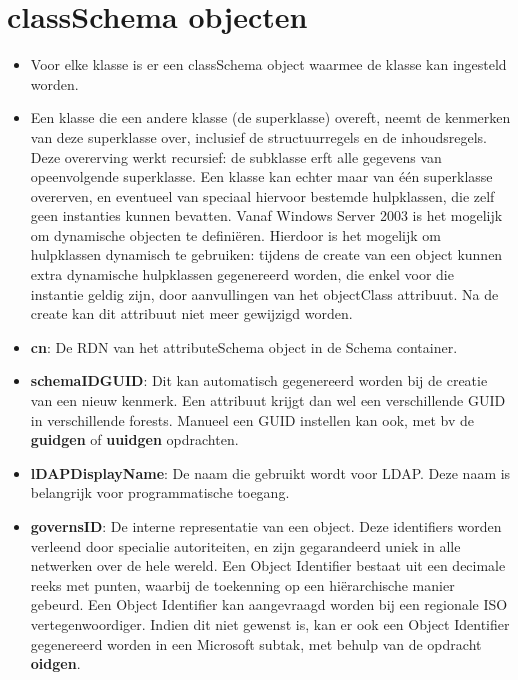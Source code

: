 \documentclass{report}
\begin{document}
	\section{classSchema objecten }
	\begin{enumerate}
		 { 
			\begin{itemize}
				\item Voor elke klasse is er een classSchema object waarmee de klasse kan ingesteld worden. 
			\end{itemize}	
		}
		
		 {
			\begin{itemize}
				\item Een klasse die een andere klasse (de superklasse) overeft, neemt de kenmerken van deze superklasse over, inclusief de structuurregels en de inhoudsregels. Deze overerving werkt recursief: de subklasse erft alle gegevens van opeenvolgende superklasse. Een klasse kan echter maar van één superklasse overerven, en eventueel van speciaal hiervoor bestemde hulpklassen, die zelf geen instanties kunnen bevatten. Vanaf Windows Server 2003 is het mogelijk om dynamische objecten te definiëren. Hierdoor is het mogelijk om hulpklassen dynamisch te gebruiken: tijdens de create van een object kunnen extra dynamische hulpklassen gegenereerd worden, die enkel voor die instantie geldig zijn, door aanvullingen van het objectClass attribuut. Na de create kan dit attribuut niet meer gewijzigd worden.
			\end{itemize}	
		}
		
		 { 
			\begin{itemize}
				\item \textbf{cn}: De RDN van het attributeSchema object in de Schema container.
				\item \textbf{schemaIDGUID}: Dit kan automatisch gegenereerd worden bij de creatie van een nieuw kenmerk. Een attribuut krijgt dan wel een verschillende GUID in verschillende forests. Manueel een GUID instellen kan ook, met bv de \textbf{guidgen} of \textbf{uuidgen} opdrachten.
				\item \textbf{lDAPDisplayName}: De naam die gebruikt wordt voor LDAP. Deze naam is belangrijk voor programmatische toegang.
				\item \textbf{governsID}: De interne representatie van een object. Deze identifiers worden verleend door specialie autoriteiten, en zijn gegarandeerd uniek in alle netwerken over de hele wereld. Een Object Identifier bestaat uit een decimale reeks met punten, waarbij de toekenning op een hiërarchische manier gebeurd. Een Object Identifier kan aangevraagd worden bij een regionale ISO vertegenwoordiger. Indien dit niet gewenst is, kan er ook een Object Identifier gegenereerd worden in een Microsoft subtak, met behulp van de opdracht \textbf{oidgen}.
			\end{itemize}
		}
		

\end{enumerate}
\end{document}
